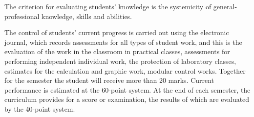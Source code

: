\documentclass{rnp}
\begin{document}
The criterion for evaluating students' knowledge is the systemicity of general-professional knowledge, skills and abilities.

The control of students' current progress is carried out using the electronic journal, which records assessments for all types of student work, and this is the evaluation of the work in the classroom in practical classes, assessments for performing independent individual work, the protection of laboratory classes, estimates for the calculation and graphic work, modular control works. Together for the semester the student will receive more than 20 marks. Current performance is estimated at the 60-point system. At the end of each semester, the curriculum provides for a score or examination, the results of which are evaluated by the 40-point system.
\end{document}

